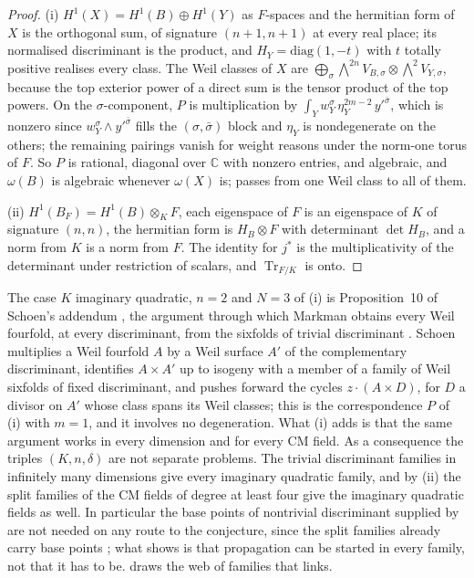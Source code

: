 \documentclass[11pt,reqno]{amsart}
\theoremstyle{plain}
\theoremstyle{definition}
\theoremstyle{remark}
\newcommand{\CC}{\mathbb{C}}
\DeclareMathOperator{\Tr}{Tr}
\begin{document}
\begin{proof}
(i) $H^{1}(X)=H^{1}(B)\oplus H^{1}(Y)$ as $F$-spaces and the hermitian form
of $X$ is the orthogonal sum, of signature $(n+1,n+1)$ at every real place;
its normalised discriminant is the product, and $H_{Y}=\mathrm{diag}(1,-t)$
with $t$ totally positive realises every class. The Weil classes of $X$ are
$\bigoplus_{\sigma}\bigwedge^{2n}V_{B,\sigma}\otimes\bigwedge^{2}V_{Y,\sigma}$,
because the top exterior power of a direct sum is the tensor product of the
top powers. On the $\sigma$-component, $P$ is multiplication by
$\int_{Y}w_{Y}^{\sigma}\,\eta_{Y}^{2m-2}\,y'^{\bar\sigma}$, which is nonzero
since $w_{Y}^{\sigma}\wedge y'^{\bar\sigma}$ fills the $(\sigma,\bar\sigma)$
block and $\eta_{Y}$ is nondegenerate on the others; the remaining pairings
vanish for weight reasons under the norm-one torus of $F$. So $P$ is
rational, diagonal over $\CC$ with nonzero entries, and algebraic, and
$\omega(B)$ is algebraic whenever $\omega(X)$ is; \cite[Lemma~16.3]{paperI}
passes from one Weil class to all of them.

(ii) $H^{1}(B_{F})=H^{1}(B)\otimes_{K}F$, each eigenspace of $F$ is an
eigenspace of $K$ of signature $(n,n)$, the hermitian form is $H_{B}\otimes F$ with determinant $\det H_{B}$, and a norm
from $K$ is a norm from $F$. The identity for $j^{*}$ is the multiplicativity
of the determinant under restriction of scalars, and $\Tr_{F/K}$ is onto.
\end{proof}

The case $K$ imaginary quadratic, $n=2$ and $N=3$ of (i) is Proposition~10
of Schoen's addendum \cite{Sch98}, the argument through which Markman obtains
every Weil fourfold, at every discriminant, from the sixfolds of trivial
discriminant \cite{Mar25a}. Schoen multiplies a Weil fourfold $A$ by a Weil
surface $A'$ of the complementary discriminant, identifies $A\times A'$ up to
isogeny with a member of a family of Weil sixfolds of fixed discriminant, and
pushes forward the cycles $z\cdot(A\times D)$, for $D$ a divisor on $A'$
whose class spans its Weil classes; this is the correspondence $P$ of (i)
with $m=1$, and it involves no degeneration. What (i) adds is that the same
argument works in every dimension and for every CM field. As a consequence
the triples $(K,n,\delta)$ are not separate problems. The trivial
discriminant families in infinitely many dimensions give every imaginary
quadratic family, and by (ii) the split families of the CM fields of degree
at least four give the imaginary quadratic fields as well. In particular the
base points of nontrivial discriminant supplied by \cite[Theorem~15.27]{paperI} are
not needed on any route to the conjecture, since the split families already
carry base points \cite[(34)]{paperI}; what \cite[Theorem~15.27]{paperI} shows
is that propagation can be started in every family, not that it has to be.
 draws the web of families that  links.
\end{document}
